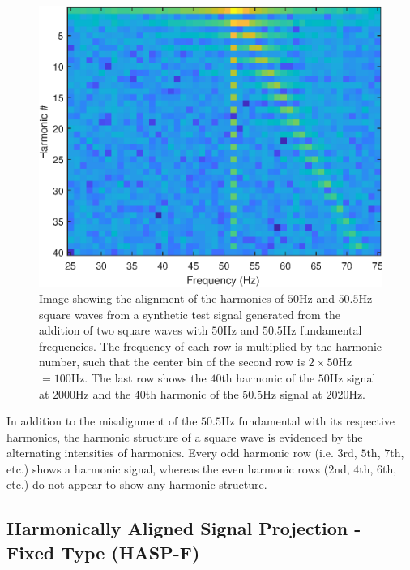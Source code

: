 \begin{figure}[tb]
	\includegraphics[width=\textwidth]{./dasp_algorithm_results/harmonic_aligned_example.eps}
	\centering
	\caption{Image showing the alignment of the harmonics of $50$Hz and $50.5$Hz square waves from a synthetic test signal generated from the addition of two square waves with $50$Hz and $50.5$Hz fundamental frequencies.  The frequency of each row is multiplied by the harmonic number, such that the center bin of the second row is $2 \times 50$Hz$ = 100$Hz.  The last row shows the $40$th harmonic of the $50$Hz signal at $2000$Hz and the $40$th harmonic of the $50.5$Hz signal at $2020$Hz.}
	\label{fig:harm_aligned_example}
\end{figure}

In addition to the misalignment of the $50.5$Hz fundamental with its respective harmonics, the harmonic structure of a square wave is evidenced by the alternating intensities of harmonics.  Every odd harmonic row (i.e. $3$rd, $5$th, $7$th, etc.) shows a harmonic signal, whereas the even harmonic rows ($2$nd, $4$th, $6$th, etc.) do not appear to show any harmonic structure.

\subsection[Harmonically Aligned Signal Projection - Fixed Type (HASP-F)]{Harmonically Aligned Signal Projection - Fixed Type (HASP-F)}
\label{Harmonically Aligned Signal Projection - Fixed Type}

